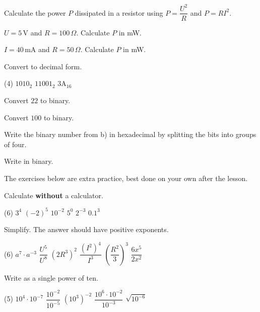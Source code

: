 Calculate the power $P$ dissipated in a resistor using $P = \dfrac{U^2}{R}$ and $P = RI^2$.
\begin{parts}
  \item $U = 5\,\text{V}$ and $R = 100\,\Omega$. Calculate $P$ in mW.
  \item $I = 40\,\text{mA}$ and $R = 50\,\Omega$. Calculate $P$ in mW.
\end{parts}

Convert to decimal form.
\begin{delar}(4)
  \task $1010_2$
  \task $11001_2$
  \task $\mathrm{3A}_{16}$
  \task {}
\end{delar}

\begin{parts}
  \item Convert $22$ to binary.
  \item Convert $100$ to binary.
  \item Write the binary number from b) in hexadecimal by splitting the bits into groups of four.
  \item Write  in binary.
\end{parts}

The exercises below are extra practice, best done on your own after the lesson.

Calculate \textbf{without} a calculator.
\begin{delar}(6)
  \task $3^4$
  \task $(-2)^5$
  \task $10^{-2}$
  \task $5^0$
  \task $2^{-3}$
  \task $0.1^3$
\end{delar}

Simplify. The answer should have positive exponents.
\begin{delar}(6)
  \task $a^7 \cdot a^{-3}$
  \task $\dfrac{U^5}{U^8}$
  \task $(2R^3)^2$
  \task $\dfrac{(I^2)^4}{I^3}$
  \task $\left(\dfrac{R^2}{3}\right)^3$
  \task $\dfrac{6x^5}{2x^2}$
\end{delar}

Write as a single power of ten.
\begin{delar}(5)
  \task $10^4 \cdot 10^{-7}$
  \task $\dfrac{10^{-2}}{10^{-5}}$
  \task $\left(10^3\right)^{-2}$
  \task $\dfrac{10^6 \cdot 10^{-2}}{10^{-3}}$
  \task $\sqrt{10^{-6}}$
\end{delar}

